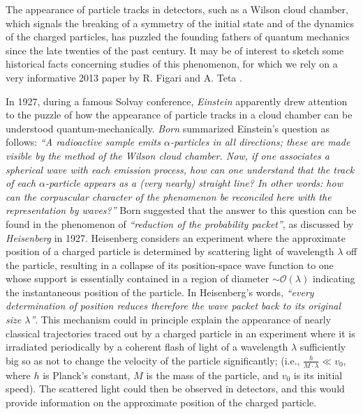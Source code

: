 \documentclass[12pt]{article}
\begin{document}
 The appearance of particle tracks in detectors, such as a Wilson cloud chamber, which signals the breaking of 
 a symmetry of the initial state and of the dynamics of the charged particles, has puzzled the founding fathers of 
 quantum mechanics since the late twenties of the past century. It may be of interest to sketch some historical facts 
 concerning studies of this phenomenon, for which we rely on a very informative 2013 paper by R. Figari and A. Teta \cite{FiTe}.  
 
 In 1927, during a famous Solvay conference, \textit{Einstein} apparently drew attention to the puzzle of how the appearance of 
 particle tracks in a cloud chamber can be understood quantum-mechanically. \textit{Born} summarized Einstein's question as follows: \textit{``A radioactive sample emits $\alpha$-particles in all directions; 
 these are made visible by the method of the Wilson cloud chamber. Now, if one associates a spherical wave with each 
 emission process, how can one understand that the track of each $\alpha$-particle appears as a (very nearly) straight line? 
 In other words: how can the corpuscular character of the phenomenon be reconciled here with the representation by waves?''} 
 Born suggested that the answer to this question can be found in the phenomenon of \textit{``reduction of the probability packet''}, 
 as discussed by \textit{Heisenberg} in 1927. Heisenberg considers an experiment where the approximate 
 position of a charged particle
  is determined by scattering light of wavelength $\lambda$ off the particle, resulting in a collapse of its 
  position-space wave function to one whose support is essentially contained in a region of diameter 
  $\sim \mathcal{O}(\lambda)$ indicating the instantaneous position of the particle. In Heisenberg's words, 
  \textit{``every determination of position reduces therefore the wave packet back to its original size $\lambda$''}. 
  This mechanism could in principle explain the appearance of nearly classical trajectories traced out by a charged particle 
  in an experiment where it is irradiated periodically by a coherent flash of light of a wavelength  
  $\lambda$ sufficiently big so as not to change the velocity of the particle significantly; 
  (i.e., $\frac{h}{M\cdot \lambda} \ll v_0$, where $h$ is Planck's constant, $M$ is the mass of the particle, and $v_0$ 
  is its initial speed). The scattered light could then be observed in detectors, and this would 
  provide information on the approximate position of the charged particle.
  
\end{document}
